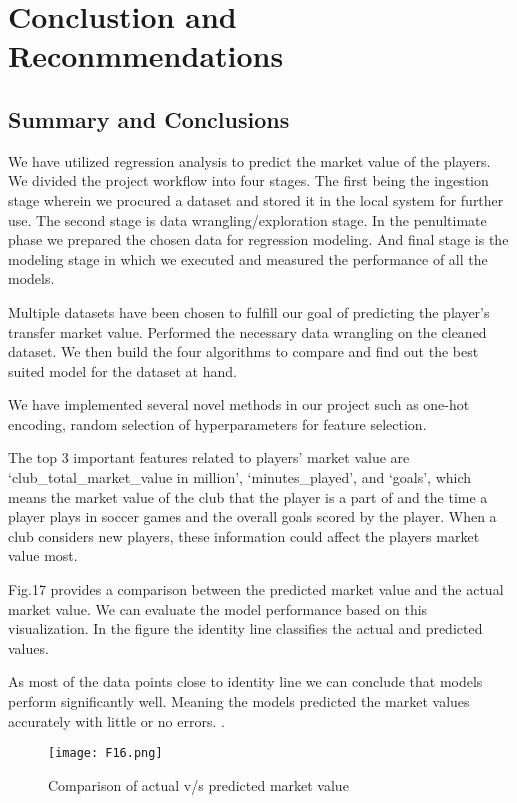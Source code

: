 \documentclass[conference]{IEEEtran}
\begin{document}
\section{Conclustion and Reconmmendations}


\subsection{Summary and Conclusions}
We have utilized regression analysis to predict the market value of the players. We divided the project workflow into four stages. The first being the ingestion stage wherein we procured a dataset and stored it in the local system for further use. The second stage is data wrangling/exploration stage. In the penultimate phase we prepared the chosen data for  regression modeling. And final stage is the modeling stage in which we executed and measured the performance of all the models. \par
 Multiple datasets have been chosen to fulfill our goal of predicting the player’s transfer market value. Performed the necessary data wrangling on the cleaned dataset. We then build the four algorithms to compare and find out the best suited model for the dataset at hand. \par
We have implemented several novel methods in our project such as one-hot encoding, random selection of hyperparameters for feature selection.\par
The top 3 important features related to players' market value are ‘club\_total\_market\_value in million’, ‘minutes\_played’, and ‘goals’, which means the market value of the club that the player is a part of and the time a player plays in soccer games and the overall goals scored by the player. When a club considers new players, these information could affect the players market value most. \par
Fig.17 provides a comparison between the predicted market value and the actual market value. We can evaluate the model performance based on this visualization. In the figure the identity line classifies the actual and predicted values. \par
 As most of the data points close to identity line we can conclude that models perform significantly well. Meaning the models predicted the market values accurately with little or no errors. 
. 
\begin{figure}[ht]
\begin{center}
\centerline{\texttt{[image: F16.png]}}
\caption{Comparison of actual v/s predicted market value}
\label{bayespic}
\end{center}
\end{figure}
\end{document}
